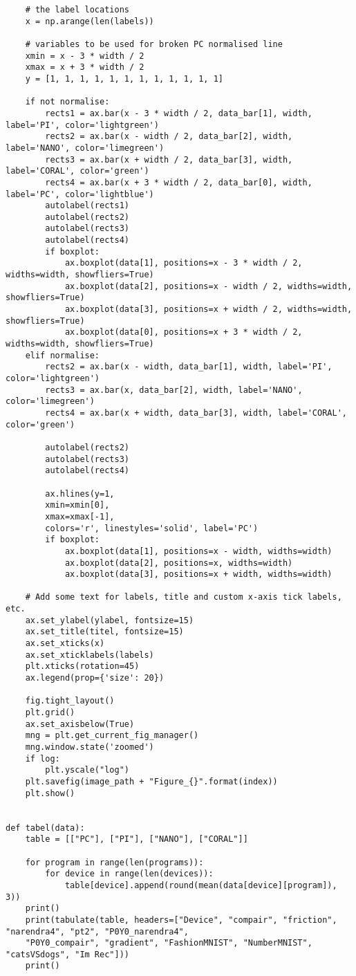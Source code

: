 \begin{lstlisting}
	# the label locations
	x = np.arange(len(labels))
	
	# variables to be used for broken PC normalised line
	xmin = x - 3 * width / 2
	xmax = x + 3 * width / 2
	y = [1, 1, 1, 1, 1, 1, 1, 1, 1, 1, 1, 1]
	
	if not normalise:
		rects1 = ax.bar(x - 3 * width / 2, data_bar[1], width, label='PI', color='lightgreen')
		rects2 = ax.bar(x - width / 2, data_bar[2], width, label='NANO', color='limegreen')
		rects3 = ax.bar(x + width / 2, data_bar[3], width, label='CORAL', color='green')
		rects4 = ax.bar(x + 3 * width / 2, data_bar[0], width, label='PC', color='lightblue')
		autolabel(rects1)
		autolabel(rects2)
		autolabel(rects3)
		autolabel(rects4)
		if boxplot:
			ax.boxplot(data[1], positions=x - 3 * width / 2, widths=width, showfliers=True)
			ax.boxplot(data[2], positions=x - width / 2, widths=width, showfliers=True)
			ax.boxplot(data[3], positions=x + width / 2, widths=width, showfliers=True)
			ax.boxplot(data[0], positions=x + 3 * width / 2, widths=width, showfliers=True)
	elif normalise:
		rects2 = ax.bar(x - width, data_bar[1], width, label='PI', color='lightgreen')
		rects3 = ax.bar(x, data_bar[2], width, label='NANO', color='limegreen')
		rects4 = ax.bar(x + width, data_bar[3], width, label='CORAL', color='green')
	
		autolabel(rects2)
		autolabel(rects3)
		autolabel(rects4)
	
		ax.hlines(y=1,
		xmin=xmin[0],
		xmax=xmax[-1],
		colors='r', linestyles='solid', label='PC')
		if boxplot:
			ax.boxplot(data[1], positions=x - width, widths=width)
			ax.boxplot(data[2], positions=x, widths=width)
			ax.boxplot(data[3], positions=x + width, widths=width)
		
	# Add some text for labels, title and custom x-axis tick labels, etc.
	ax.set_ylabel(ylabel, fontsize=15)
	ax.set_title(titel, fontsize=15)
	ax.set_xticks(x)
	ax.set_xticklabels(labels)
	plt.xticks(rotation=45)
	ax.legend(prop={'size': 20})
	
	fig.tight_layout()
	plt.grid()
	ax.set_axisbelow(True)
	mng = plt.get_current_fig_manager()
	mng.window.state('zoomed')
	if log:
		plt.yscale("log")
	plt.savefig(image_path + "Figure_{}".format(index))
	plt.show()


def tabel(data):
	table = [["PC"], ["PI"], ["NANO"], ["CORAL"]]
	
	for program in range(len(programs)):
		for device in range(len(devices)):
			table[device].append(round(mean(data[device][program]), 3))
	print()
	print(tabulate(table, headers=["Device", "compair", "friction", "narendra4", "pt2", "P0Y0_narendra4",
	"P0Y0_compair", "gradient", "FashionMNIST", "NumberMNIST", "catsVSdogs", "Im Rec"]))
	print()



\end{lstlisting}
